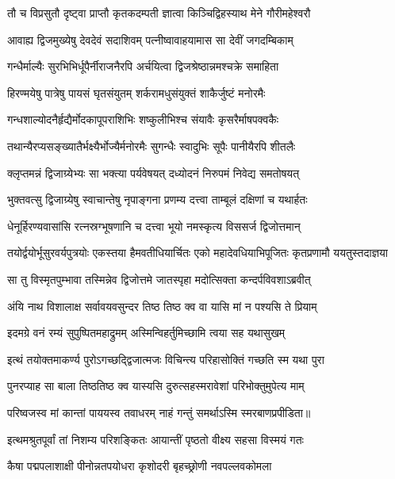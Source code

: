 \twolineshloka
{तौ च विप्रसुतौ दृष्ट्वा प्राप्तौ कृतकदम्पती}
{ज्ञात्वा किञ्चिद्विहस्याथ मेने गौरीमहेश्वरौ} %

\twolineshloka
{आवाह्य द्विजमुख्येषु देवदेवं सदाशिवम्}
{पत्नीष्वावाहयामास सा देवीं जगदम्बिकाम्} %

\twolineshloka
{गन्धैर्माल्यैः सुरभिभिर्धूपैर्नीराजनैरपि}
{अर्चयित्वा द्विजश्रेष्ठान्नमश्चक्रे समाहिता} %

\twolineshloka
{हिरण्मयेषु पात्रेषु पायसं घृतसंयुतम्}
{शर्करामधुसंयुक्तं शाकैर्जुष्टं मनोरमैः} %

\twolineshloka
{गन्धशाल्योदनैर्हृद्यैर्मोदकापूपराशिभिः}
{शष्कुलीभिश्च संयावैः कृसरैर्माषपक्वकैः} %

\twolineshloka
{तथान्यैरप्यसङ्ख्यातैर्भक्ष्यैर्भोज्यैर्मनोरमैः}
{सुगन्धैः स्वादुभिः सूपैः पानीयैरपि शीतलैः} %

\twolineshloka
{क्लृप्तमन्नं द्विजाग्र्येभ्यः सा भक्त्या पर्यवेषयत्}
{दध्योदनं निरुपमं निवेद्य समतोषयत्} %

\twolineshloka
{भुक्तवत्सु द्विजाग्र्येषु स्वाचान्तेषु नृपाङ्गना}
{प्रणम्य दत्त्वा ताम्बूलं दक्षिणां च यथार्हतः} %

\twolineshloka
{धेनूर्हिरण्यवासांसि रत्नस्रग्भूषणानि च}
{दत्त्वा भूयो नमस्कृत्य विससर्ज द्विजोत्तमान्} %

\fourlineindentedshloka
{तयोर्द्वयोर्भूसुरवर्यपुत्रयोः}
{एकस्तया हैमवतीधियार्चितः}
{एको महादेवधियाभिपूजितः}
{कृतप्रणामौ ययतुस्तदाज्ञया} %

\twolineshloka
{सा तु विस्मृतपुम्भावा तस्मिन्नेव द्विजोत्तमे}
{जातस्पृहा मदोत्सिक्ता कन्दर्पविवशाऽब्रवीत्} %

\twolineshloka
{अंयि नाथ विशालाक्ष सर्वावयवसुन्दर}
{तिष्ठ तिष्ठ क्व वा यासि मां न पश्यसि ते प्रियाम्} %

\twolineshloka
{इदमग्रे वनं रम्यं सुपुष्पितमहाद्रुमम्}
{अस्मिन्विहर्तुमिच्छामि त्वया सह यथासुखम्} %

\twolineshloka
{इत्थं तयोक्तमाकर्ण्य पुरोऽगच्छद्द्विजात्मजः}
{विचिन्त्य परिहासोक्तिं गच्छति स्म यथा पुरा} %

\twolineshloka
{पुनरप्याह सा बाला तिष्ठतिष्ठ क्व यास्यसि}
{दुरुत्सहस्मरावेशां परिभोक्तुमुपेत्य माम्} %

\twolineshloka
{परिष्वजस्व मां कान्तां पाययस्व तवाधरम्}
{नाहं गन्तुं समर्थाऽस्मि स्मरबाणप्रपीडिता॥} %

\twolineshloka
{इत्थमश्रुतपूर्वां तां निशम्य परिशङ्कितः}
{आयान्तीं पृष्ठतो वीक्ष्य सहसा विस्मयं गतः} %

\twolineshloka
{कैषा पद्मपलाशाक्षी पीनोन्नतपयोधरा}
{कृशोदरी बृहच्छ्रोणी नवपल्लवकोमला} %

